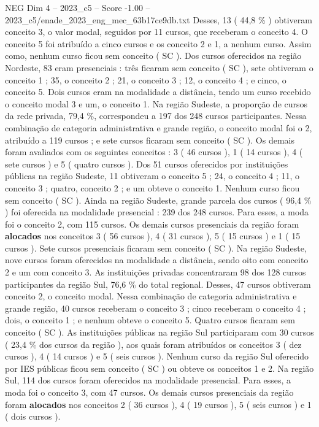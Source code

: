 \begin{textsample}{NEG Dim 4 – 2023\_c5 – Score -1.00 – 2023\_c5/enade\_2023\_eng\_mec\_63b17ce9db.txt}
Desses, 13 ( 44,8 \% ) obtiveram conceito 3, o valor modal, seguidos por 11 cursos, que receberam o conceito 4.
O conceito 5 foi atribuído a cinco cursos e os conceito 2 e 1, a nenhum curso.
Assim como, nenhum curso ficou sem conceito ( SC ).
Dos cursos oferecidos na região Nordeste, 83 eram presenciais : três ficaram sem conceito ( SC ), sete obtiveram o conceito 1 ; 35, o conceito 2 ; 21, o conceito 3 ; 12, o conceito 4 ; e cinco, o conceito 5.
Dois cursos eram na modalidade a distância, tendo um curso recebido o conceito modal 3 e um, o conceito 1.
Na região Sudeste, a proporção de cursos da rede privada, 79,4 \%, correspondeu a 197 dos 248 cursos participantes.
Nessa combinação de categoria administrativa e grande região, o conceito modal foi o 2, atribuído a 119 cursos ; e sete cursos ficaram sem conceito ( SC ).
Os demais foram avaliados com os seguintes conceitos : 3 ( 46 cursos ), 1 ( 14 cursos ), 4 ( sete cursos ) e 5 ( quatro cursos ).
Dos 51 cursos oferecidos por instituições públicas na região Sudeste, 11 obtiveram o conceito 5 ; 24, o conceito 4 ; 11, o conceito 3 ; quatro, conceito 2 ; e um obteve o conceito 1.
Nenhum curso ficou sem conceito ( SC ).
Ainda na região Sudeste, grande parcela dos cursos ( 96,4 \% ) foi oferecida na modalidade presencial : 239 dos 248 cursos.
Para esses, a moda foi o conceito 2, com 115 cursos.
Os demais cursos presenciais da região foram \textbf{alocados} nos conceitos 3 ( 56 cursos ), 4 ( 31 cursos ), 5 ( 15 cursos ) e 1 ( 15 cursos ).
Sete cursos presenciais ficaram sem conceito ( SC ).
Na região Sudeste, nove cursos foram oferecidos na modalidade a distância, sendo oito com conceito 2 e um com conceito 3.
As instituições privadas concentraram 98 dos 128 cursos participantes da região Sul, 76,6 \% do total regional.
Desses, 47 cursos obtiveram conceito 2, o conceito modal.
Nessa combinação de categoria administrativa e grande região, 40 cursos receberam o conceito 3 ; cinco receberam o conceito 4 ; dois, o conceito 1 ; e nenhum obteve o conceito 5.
Quatro cursos ficaram sem conceito ( SC ).
As instituições públicas na região Sul participaram com 30 cursos ( 23,4 \% dos cursos da região ), aos quais foram atribuídos os conceitos 3 ( dez cursos ), 4 ( 14 cursos ) e 5 ( seis cursos ).
Nenhum curso da região Sul oferecido por IES públicas ficou sem conceito ( SC ) ou obteve os conceitos 1 e 2.
Na região Sul, 114 dos cursos foram oferecidos na modalidade presencial.
Para esses, a moda foi o conceito 3, com 47 cursos.
Os demais cursos presenciais da região foram \textbf{alocados} nos conceitos 2 ( 36 cursos ), 4 ( 19 cursos ), 5 ( seis cursos ) e 1 ( dois cursos ).

\end{textsample}

